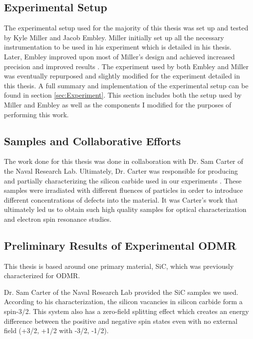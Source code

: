 \documentclass[oneside]{BYUPhys}
\begin{document}
\subsection{Experimental Setup}

The experimental setup used for the majority of this thesis was set up and tested by Kyle Miller and Jacob Embley. Miller initially set up all the necessary instrumentation to be used in his experiment which is detailed in his thesis. Later, Embley improved upon most of Miller's design and achieved increased precision and improved results \cite{RefWorks:doc:5892912ae4b0dec22aee3993}. The experiment used by both Embley and Miller was eventually repurposed and slightly modified for the experiment detailed in this thesis. A full summary and implementation of the experimental setup can be found in section \ref{sec:Experiment}. This section includes both the setup used by Miller and Embley as well as the components I modified for the purposes of performing this work.

\subsection{Samples and Collaborative Efforts}

The work done for this thesis was done in collaboration with Dr. Sam Carter of the Naval Research Lab. Ultimately, Dr. Carter was responsible for producing and partially characterizing the silicon carbide used in our experiments \cite{RefWorks:doc:5892964ee4b0499fa95c5108}. These samples were irradiated with different fluences of particles in order to introduce different concentrations of defects into the material. It was Carter's work that ultimately led us to obtain such high quality samples for optical characterization and electron spin resonance studies.

\subsection{Preliminary Results of Experimental ODMR}

This thesis is based around one primary material, SiC, which was previously characterized for ODMR.

Dr. Sam Carter of the Naval Research Lab provided the SiC samples we used. According to his characterization, the silicon vacancies in silicon carbide form a spin-3/2. This system also has a zero-field splitting effect which creates an energy difference between the positive and negative spin states even with no external field (+3/2, +1/2 with -3/2, -1/2).
 
\end{document}

